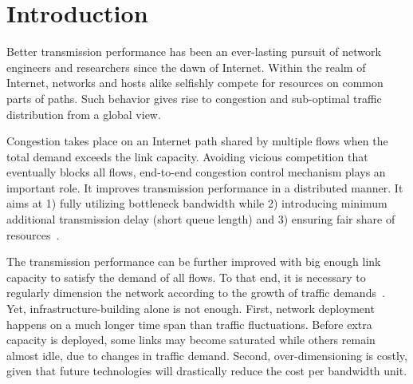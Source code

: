 \chapter{Introduction}
\label{sec:intro}

Better transmission performance has been an ever-lasting pursuit of network engineers and researchers since the dawn of Internet. 
Within the realm of Internet, networks and hosts alike selfishly compete for resources on common parts of paths.
Such behavior gives rise to congestion and sub-optimal traffic distribution from a global view.

Congestion takes place on an Internet path shared by multiple flows when the total demand exceeds the link capacity.
Avoiding vicious competition that eventually blocks all flows, end-to-end congestion control mechanism plays an important role. It improves transmission performance in a distributed manner.
It aims at 1) fully utilizing bottleneck bandwidth while 2) introducing minimum additional transmission delay (short queue length) and 3) ensuring fair share of resources~\cite{Jacobson1988, mathis1997macroscopic, Cardwell2016}.

The transmission performance can be further improved with big enough link capacity to satisfy the demand of all flows. To that end, it is necessary to regularly dimension the network according to the growth of traffic demands~\cite{pioro2004routing}. 
Yet, infrastructure-building alone is not enough. First, network deployment happens on a much longer time span than traffic fluctuations. Before extra capacity is deployed, some links may become saturated while others remain almost idle, due to changes in traffic demand. Second, over-dimensioning is costly, given that future technologies will drastically reduce the cost per bandwidth unit.

